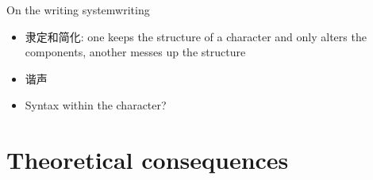 \documentclass[UTF8, a4paper, oneside, scheme=plain, 12pt]{ctexrep}
\begin{document}
\begin{todobox}{On the writing system}{writing}
    \begin{itemize}
        \item 隶定和简化: one keeps the structure of a character and only alters the components, another messes up the structure
        \item 谐声
        \item Syntax within the character?
    \end{itemize}
\end{todobox}

\section{Theoretical consequences}\label{sec:writing-system.theoretical}
\end{document}
